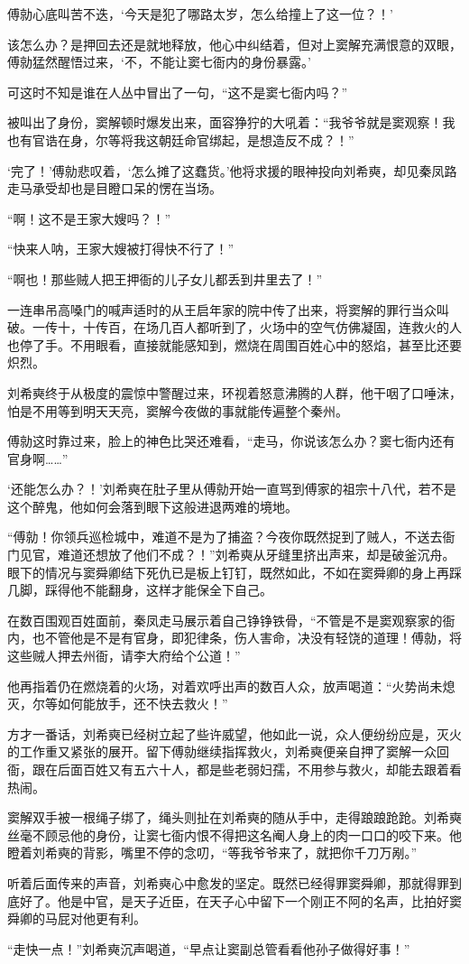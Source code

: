傅勍心底叫苦不迭，‘今天是犯了哪路太岁，怎么给撞上了这一位？！’

该怎么办？是押回去还是就地释放，他心中纠结着，但对上窦解充满恨意的双眼，傅勍猛然醒悟过来，‘不，不能让窦七衙内的身份暴露。’

可这时不知是谁在人丛中冒出了一句，“这不是窦七衙内吗？”

被叫出了身份，窦解顿时爆发出来，面容狰狞的大吼着：“我爷爷就是窦观察！我也有官诰在身，尔等将我这朝廷命官绑起，是想造反不成？！”

‘完了！’傅勍悲叹着，‘怎么摊了这蠢货。’他将求援的眼神投向刘希奭，却见秦凤路走马承受却也是目瞪口呆的愣在当场。

“啊！这不是王家大嫂吗？！”

“快来人呐，王家大嫂被打得快不行了！”

“啊也！那些贼人把王押衙的儿子女儿都丢到井里去了！”

一连串吊高嗓门的喊声适时的从王启年家的院中传了出来，将窦解的罪行当众叫破。一传十，十传百，在场几百人都听到了，火场中的空气仿佛凝固，连救火的人也停了手。不用眼看，直接就能感知到，燃烧在周围百姓心中的怒焰，甚至比还要炽烈。

刘希奭终于从极度的震惊中警醒过来，环视着怒意沸腾的人群，他干咽了口唾沫，怕是不用等到明天天亮，窦解今夜做的事就能传遍整个秦州。

傅勍这时靠过来，脸上的神色比哭还难看，“走马，你说该怎么办？窦七衙内还有官身啊……”

‘还能怎么办？！’刘希奭在肚子里从傅勍开始一直骂到傅家的祖宗十八代，若不是这个醉鬼，他如何会落到眼下这般进退两难的境地。

“傅勍！你领兵巡检城中，难道不是为了捕盗？今夜你既然捉到了贼人，不送去衙门见官，难道还想放了他们不成？！”刘希奭从牙缝里挤出声来，却是破釜沉舟。眼下的情况与窦舜卿结下死仇已是板上钉钉，既然如此，不如在窦舜卿的身上再踩几脚，踩得他不能翻身，这样才能保全下自己。

在数百围观百姓面前，秦凤走马展示着自己铮铮铁骨，“不管是不是窦观察家的衙内，也不管他是不是有官身，即犯律条，伤人害命，决没有轻饶的道理！傅勍，将这些贼人押去州衙，请李大府给个公道！”

他再指着仍在燃烧着的火场，对着欢呼出声的数百人众，放声喝道：“火势尚未熄灭，尔等如何能放手，还不快去救火！”

方才一番话，刘希奭已经树立起了些许威望，他如此一说，众人便纷纷应是，灭火的工作重又紧张的展开。留下傅勍继续指挥救火，刘希奭便亲自押了窦解一众回衙，跟在后面百姓又有五六十人，都是些老弱妇孺，不用参与救火，却能去跟着看热闹。

窦解双手被一根绳子绑了，绳头则扯在刘希奭的随从手中，走得踉踉跄跄。刘希奭丝毫不顾忌他的身份，让窦七衙内恨不得把这名阉人身上的肉一口口的咬下来。他瞪着刘希奭的背影，嘴里不停的念叨，“等我爷爷来了，就把你千刀万剐。”

听着后面传来的声音，刘希奭心中愈发的坚定。既然已经得罪窦舜卿，那就得罪到底好了。他是中官，是天子近臣，在天子心中留下一个刚正不阿的名声，比拍好窦舜卿的马屁对他更有利。

“走快一点！”刘希奭沉声喝道，“早点让窦副总管看看他孙子做得好事！”

